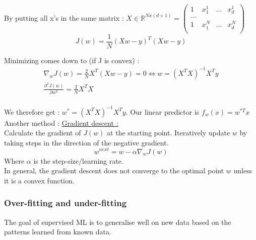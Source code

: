 \documentclass[../main.tex]{subfiles}
\begin{document}
By putting all x's in the same matrix : $X \in \mathbb{R}^{Nx(d+1)} = \begin{pmatrix}
    1 & x_1^1 & \dots & x_d^1\\
    \dots\\
    1 & x_1^N & \dots & x_d^N\\
\end{pmatrix}$\\

\begin{equation}
    J(w) = \frac{1}{N} (Xw-y)^T(Xw-y)
\end{equation}

Minimizing comes down to (if J is convex) : \begin{equation}
    \begin{gathered}
        \nabla_w J(w) = \frac{2}{N}X^T(Xw-y) = 0 \Leftrightarrow w=(X^TX)^{-1} X^Ty\\
        \frac{\partial^2 J(w)}{\partial w^2} = \frac{2}{N} X^TX\\
    \end{gathered}
\end{equation}

We therefore get : $w^* = (X^TX)^{-1}X^Ty$. Our linear predictor is $f_w(x) = w^{*T}x$\\

Another method : \underline{Gradient descent :}\\

Calculate the gradient of $J(w)$ at the starting point. Iteratively update $w$ by taking steps in the direction of the negative gradient.\\
\begin{equation}
    w^{next} = w-\alpha \nabla_w J(w)
\end{equation}
Where $\alpha$ is the step-size/learning rate.\\

In general, the gradient descent does not converge to the optimal point $w$ unless it is a convex function. \\

\subsubsection{Over-fitting and under-fitting}
The goal of supervised ML is to generalise well on new data based on the patterns learned from known data.
\end{document}
